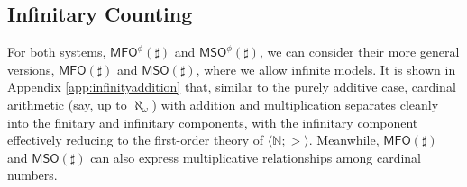 \documentclass[12pt,oneside,reqno]{amsart}
\theoremstyle{definition}
\newtheorem{remark}{Remark}
\begin{document}

\subsection{Infinitary Counting} For both systems, $\mathsf{MFO}^\phi(\sharp)$ and $\mathsf{MSO}^\phi(\sharp)$, we can consider their more general versions, $\mathsf{MFO}(\sharp)$ and $\mathsf{MSO}(\sharp)$, where we allow infinite models. It is shown in Appendix \ref{app:infinityaddition} that, similar to the purely additive case, cardinal arithmetic (say, up to $\aleph_{\omega}$) with addition and multiplication separates cleanly into the finitary and infinitary components, with the infinitary component effectively reducing to the first-order theory of $\langle \mathbb{N};> \rangle$.  Meanwhile, $\mathsf{MFO}(\sharp)$ and $\mathsf{MSO}(\sharp)$ can also express multiplicative relationships among cardinal numbers. %

\end{document}
